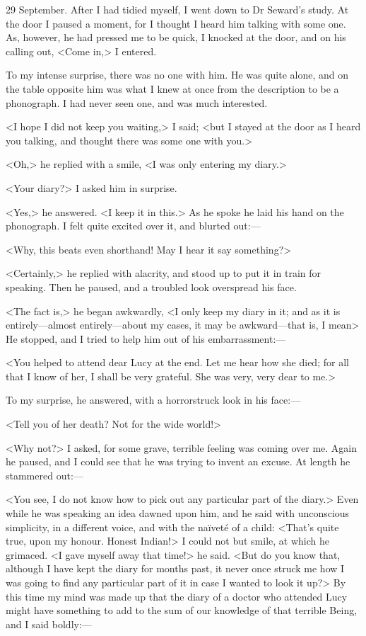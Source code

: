\begin{diary}{29 September.}
After I had tidied myself, I went down to Dr Seward's study. At the door I paused a moment, for I thought I heard him talking with some one. As, however, he had pressed me to be quick, I knocked at the door, and on his calling out, <Come in,> I entered.

To my intense surprise, there was no one with him. He was quite alone, and on the table opposite him was what I knew at once from the description to be a phonograph. I had never seen one, and was much interested.

<I hope I did not keep you waiting,> I said; <but I stayed at the door as I heard you talking, and thought there was some one with you.>

<Oh,> he replied with a smile, <I was only entering my diary.>

<Your diary?> I asked him in surprise.

<Yes,> he answered. <I keep it in this.> As he spoke he laid his hand on the phonograph. I felt quite excited over it, and blurted out:—

<Why, this beats even shorthand! May I hear it say something?>

<Certainly,> he replied with alacrity, and stood up to put it in train for speaking. Then he paused, and a troubled look overspread his face.

<The fact is,> he began awkwardly, <I only keep my diary in it; and as it is entirely—almost entirely—about my cases, it may be awkward—that is, I mean\longdash> He stopped, and I tried to help him out of his embarrassment:—

<You helped to attend dear Lucy at the end. Let me hear how she died; for all that I know of her, I shall be very grateful. She was very, very dear to me.>

To my surprise, he answered, with a horrorstruck look in his face:—

<Tell you of her death? Not for the wide world!>

<Why not?> I asked, for some grave, terrible feeling was coming over me. Again he paused, and I could see that he was trying to invent an excuse. At length he stammered out:—

<You see, I do not know how to pick out any particular part of the diary.> Even while he was speaking an idea dawned upon him, and he said with unconscious simplicity, in a different voice, and with the naïveté of a child: <That's quite true, upon my honour. Honest Indian!> I could not but smile, at which he grimaced. <I gave myself away that time!> he said. <But do you know that, although I have kept the diary for months past, it never once struck me how I was going to find any particular part of it in case I wanted to look it up?> By this time my mind was made up that the diary of a doctor who attended Lucy might have something to add to the sum of our knowledge of that terrible Being, and I said boldly:—


\end{diary}
